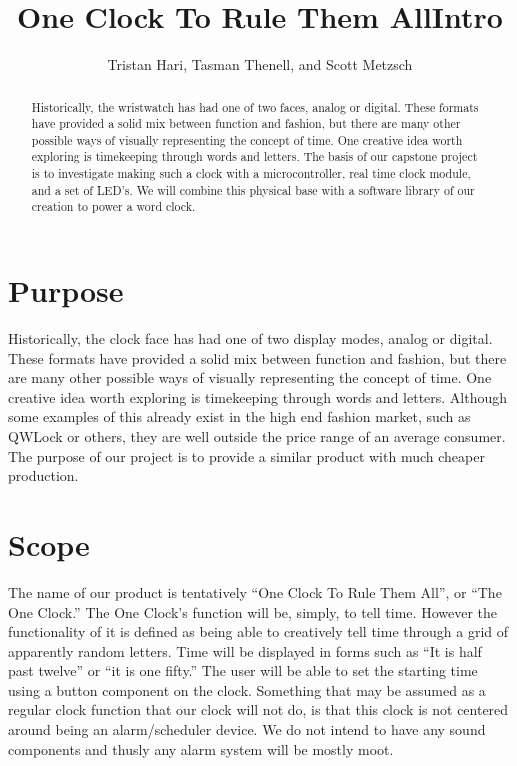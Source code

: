 \documentclass[10pt,draftclsnofoot,onecolumn]{IEEEtran}
\begin{document}
\title{One Clock To Rule Them All}
\author{Tristan Hari, Tasman Thenell, and Scott Metzsch}
\maketitle
\begin{abstract}
Historically, the wristwatch has had one of two faces, analog or digital. These
formats have provided a solid mix between function and fashion, but there are
many other possible ways of visually representing the concept of time. One
creative idea worth exploring is timekeeping through words and letters. The
basis of our capstone project is to investigate making such a clock with a
microcontroller, real time clock module, and a set of LED’s. We will combine
this physical base with a software library of our creation to power a word clock.
\end{abstract}
\IEEEpeerreviewmaketitle

\newpage
{}

\title{Intro}
\section{Purpose}
Historically, the clock face has had one of two display modes, analog or digital.
These formats have provided a solid mix between function and fashion, but there are many 
other possible ways of visually representing the concept of time. One creative idea worth
exploring is timekeeping through words and letters. Although some examples of this already 
exist in the high end fashion market, such as QWLock or others, they are well outside the 
price range of an average consumer. The purpose of our project is to provide a similar 
product with much cheaper production.

\section{Scope}
The name of our product is tentatively “One Clock To Rule Them All”, or “The One Clock.” 
The One Clock’s function will be, simply, to tell time. However the functionality of it is 
defined as being able to creatively tell time through a grid of apparently random letters. 
Time will be displayed in forms such as “It is half past twelve” or “it is one fifty.” The 
user will be able to set the starting time using a button component on the clock. Something 
that may be assumed as a regular clock function that our clock will not do, is that this clock
 is not centered around being an alarm/scheduler device. We do not intend to have any sound 
 components and thusly any alarm system will be mostly moot. 
\end{document}

